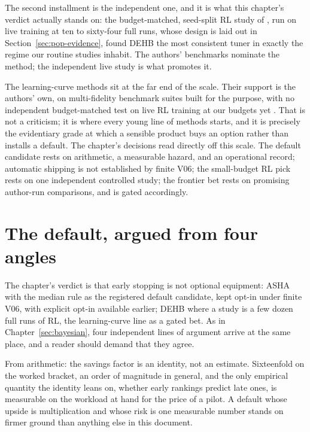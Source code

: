 The second installment is the
independent one, and it is what this chapter's verdict actually
stands on: the budget-matched, seed-split RL study of
\citet{eimer2023hyperparameters}, run on live training at ten to
sixty-four full runs, whose design is laid out in
Section~\ref{sec:pop-evidence}, found DEHB the most consistent tuner
in exactly the regime our routine studies inhabit. The authors'
benchmarks nominate the method; the independent live study is what
promotes it.

The learning-curve methods sit at the far end of the scale. Their
support is the authors' own, on multi-fidelity benchmark suites
built for the purpose, with no independent budget-matched test on
live RL training at our budgets yet \citep{wistuba2022dyhpo,
kadra2023dpl, rakotoarison2024ifbo}. That is not a criticism; it is
where every young line of methods starts, and it is precisely the
evidentiary grade at which a sensible product buys an option rather
than installs a default. The chapter's decisions read directly off
this scale. The default candidate rests on arithmetic, a measurable
hazard, and an operational record; automatic shipping is not established by finite V06; the small-budget RL pick rests on
one independent controlled study; the frontier bet rests on
promising author-run comparisons, and is gated accordingly.

\section{The default, argued from four angles}
\label{sec:mf-angles}

The chapter's verdict is that early stopping is not optional
equipment: ASHA with the median rule as the registered default candidate, kept opt-in under finite V06, with explicit opt-in available earlier; DEHB
where a study is a few dozen full runs of RL, the learning-curve
line as a gated bet. As in Chapter~\ref{sec:bayesian}, four
independent lines of argument arrive at the same place, and a reader
should demand that they agree.

From arithmetic: the savings factor is an identity, not an estimate.
Sixteenfold on the worked bracket, an order of magnitude in general,
and the only empirical quantity the identity leans on, whether early
rankings predict late ones, is measurable on the workload at hand
for the price of a pilot. A default whose upside is multiplication
and whose risk is one measurable number stands on firmer ground than
anything else in this document.

